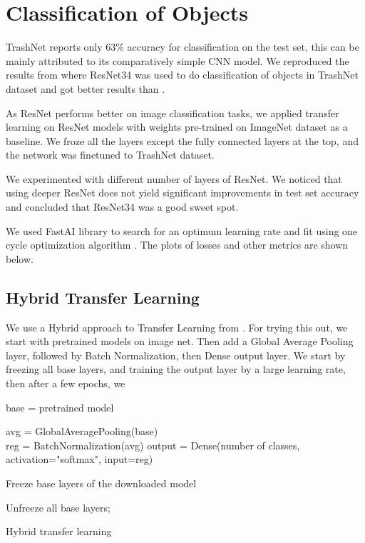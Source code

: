 \documentclass{article}
\begin{document}
\section{Classification of Objects}
TrashNet \cite{yang2016classification} reports only 63\% accuracy for classification on the test set, this can be mainly attributed to its comparatively simple CNN model. We reproduced the results from \cite{CollinChing} where ResNet34 was used to do classification of objects in TrashNet dataset  \cite{yang2016classification} and got better results than \cite{CollinChing}. 

As ResNet \cite{he2016deep} performs better on image classification tasks, we applied transfer learning on ResNet models with weights pre-trained on ImageNet dataset as a baseline. We froze all the layers except the fully connected layers at the top, and the network was finetuned to TrashNet dataset. 

We experimented with different number of layers of ResNet. We noticed that using deeper ResNet does not yield significant improvements in test set accuracy and concluded that ResNet34 was a good sweet spot. 

We used FastAI \cite{howard2018fastai} library to search for an optimum learning rate and fit using one cycle optimization algorithm \cite{1CyclePolicy}. The plots of losses and other metrics are shown below. 

\subsection{Hybrid Transfer Learning}
We use a Hybrid approach to Transfer Learning from \cite{geron2019hands}. For trying this out, we start with pretrained models on image net. Then add a Global Average Pooling layer, followed by Batch Normalization, then Dense output layer. We start by freezing all base layers, and training the output layer by a large learning rate, then after a few epochs, we 

\begin{algorithm}[H]
\SetAlgoLined
{}
 base =  pretrained model \;
 
 avg = GlobalAveragePooling(base) \\
 reg = BatchNormalization(avg)
 output = Dense(number of classes, activation="softmax", input=reg)

 Freeze base layers of the downloaded model\;

 
 Unfreeze all base layers; 
 
 \caption{Hybrid transfer learning}
\end{algorithm}
\end{document}
